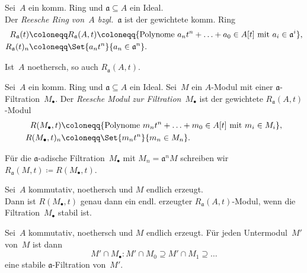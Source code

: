\documentclass{cheat-sheet}
\newcommand{\aaa}{\mathfrak{a}}
\begin{document}

\begin{defn}
  Sei~$A$ ein komm. Ring und $\aaa \subseteq A$ ein Ideal. \\
  Der \emph{Reesche Ring} \textit{von~$A$ bzgl.~$\aaa$} ist der gewichtete komm. Ring
  \begin{align*}
    R_\aaa(t) & \coloneqq R_\aaa(A, t) \coloneqq \{ \text{Polynome } a_n t^n + \ldots + a_0 \in A[t] \text{ mit } a_i \in \aaa^i \}, \\
    R_\aaa(t)_n & \coloneqq \Set{a_n t^n}{a_n \in \aaa^n}.
  \end{align*}
\end{defn}

\begin{prop}
  Ist~$A$ noethersch, so auch $R_\aaa(A, t)$.
\end{prop}

\begin{defn}
  Sei~$A$ ein komm. Ring und $\aaa \subseteq A$ ein Ideal.
  Sei~$M$ ein $A$-Modul mit einer $\aaa$-Filtration~$M_\bullet$.
  Der \emph{Reesche Modul} \textit{zur Filtration~$M_\bullet$} ist der gewichtete $R_\aaa(A, t)$-Modul
  \begin{align*}
    R(M_\bullet, t) & \coloneqq \{ \text{Polynome } m_n t^n + \ldots + m_0 \in A[t] \text{ mit } m_i \in M_i \}, \\
    R(M_\bullet, t)_n & \coloneqq \Set{m_n t^n}{m_n \in M_n}.
  \end{align*}
\end{defn}

\begin{nota}
  Für die $\aaa$-adische Filtration~$M_\bullet$ mit $M_n = \aaa^n M$ schreiben wir
  $
    R_\aaa(M, t) \coloneqq R(M_\bullet, t)
  $.
\end{nota}

\begin{prop}
  Sei~$A$ kommutativ, noethersch und $M$ endlich erzeugt. \\
  Dann ist $R(M_\bullet, t)$ genau dann ein endl. erzeugter $R_\aaa(A, t)$-Modul, wenn die Filtration~$M_\bullet$ stabil ist.
\end{prop}


\begin{prop}
  Sei~$A$ kommutativ, noethersch und $M$ endlich erzeugt.
  Für jeden Untermodul~$M'$ von~$M$ ist dann
  \[
    M' \cap M_\bullet : M' \cap M_0 \supseteq M' \cap M_1 \supseteq \ldots
  \]
   eine stabile $\aaa$-Filtration von~$M'$.
\end{prop}
\end{document}
